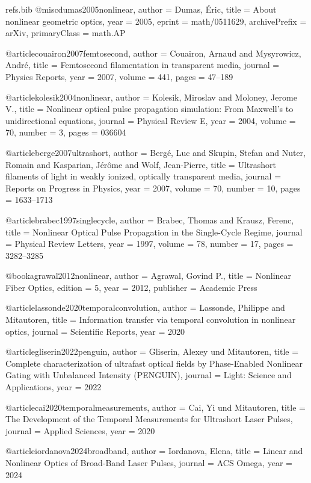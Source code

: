 
\begin{filecontents*}{refs.bib}
@misc{dumas2005nonlinear,
  author = {Dumas, Éric},
  title  = {About nonlinear geometric optics},
  year   = {2005},
  eprint = {math/0511629},
  archivePrefix = {arXiv},
  primaryClass = {math.AP}
}

@article{couairon2007femtosecond,
  author  = {Couairon, Arnaud and Mysyrowicz, André},
  title   = {Femtosecond filamentation in transparent media},
  journal = {Physics Reports},
  year    = {2007},
  volume  = {441},
  pages   = {47--189}
}

@article{kolesik2004nonlinear,
  author  = {Kolesik, Miroslav and Moloney, Jerome V.},
  title   = {Nonlinear optical pulse propagation simulation: From Maxwell’s to unidirectional equations},
  journal = {Physical Review E},
  year    = {2004},
  volume  = {70},
  number  = {3},
  pages   = {036604}
}

@article{berge2007ultrashort,
  author  = {Bergé, Luc and Skupin, Stefan and Nuter, Romain and Kasparian, Jér{\^o}me and Wolf, Jean-Pierre},
  title   = {Ultrashort filaments of light in weakly ionized, optically transparent media},
  journal = {Reports on Progress in Physics},
  year    = {2007},
  volume  = {70},
  number  = {10},
  pages   = {1633--1713}
}

@article{brabec1997singlecycle,
  author  = {Brabec, Thomas and Krausz, Ferenc},
  title   = {Nonlinear Optical Pulse Propagation in the Single-Cycle Regime},
  journal = {Physical Review Letters},
  year    = {1997},
  volume  = {78},
  number  = {17},
  pages   = {3282--3285}
}

@book{agrawal2012nonlinear,
  author    = {Agrawal, Govind P.},
  title     = {Nonlinear Fiber Optics},
  edition   = {5},
  year      = {2012},
  publisher = {Academic Press}
}

@article{lassonde2020temporalconvolution,
  author  = {Lassonde, Philippe and Mitautoren},
  title   = {Information transfer via temporal convolution in nonlinear optics},
  journal = {Scientific Reports},
  year    = {2020}
}

@article{gliserin2022penguin,
  author  = {Gliserin, Alexey und Mitautoren},
  title   = {Complete characterization of ultrafast optical fields by Phase-Enabled Nonlinear Gating with Unbalanced Intensity (PENGUIN)},
  journal = {Light: Science and Applications},
  year    = {2022}
}

@article{cai2020temporalmeasurements,
  author  = {Cai, Yi und Mitautoren},
  title   = {The Development of the Temporal Measurements for Ultrashort Laser Pulses},
  journal = {Applied Sciences},
  year    = {2020}
}

@article{iordanova2024broadband,
  author  = {Iordanova, Elena},
  title   = {Linear and Nonlinear Optics of Broad-Band Laser Pulses},
  journal = {ACS Omega},
  year    = {2024}
}
\end{filecontents*}

